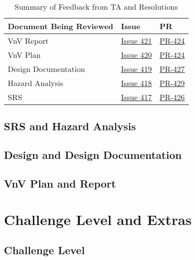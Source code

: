 \documentclass{article}
\begin{document}
\begin{table}[h!]
\centering
\begin{tabularx}{\textwidth}{lXl}
\toprule
\textbf{Document Being Reviewed} & \textbf{Issue} & \textbf{PR} \\
\midrule
VnV Report & \href{https://github.com/SyntaxSentinels/SyntaxSentinels/issues/421}{Issue 421} & \href{https://github.com/SyntaxSentinels/SyntaxSentinels/pull/424}{PR-424} \\
VnV Plan & \href{https://github.com/SyntaxSentinels/SyntaxSentinels/issues/420}{Issue 420} & \href{https://github.com/SyntaxSentinels/SyntaxSentinels/pull/424}{PR-424} \\
Design Documentation & \href{https://github.com/SyntaxSentinels/SyntaxSentinels/issues/419}{Issue 419} & \href{https://github.com/SyntaxSentinels/SyntaxSentinels/pull/427}{PR-427} \\
Hazard Analysis & \href{https://github.com/SyntaxSentinels/SyntaxSentinels/issues/418}{Issue 418} & \href{https://github.com/SyntaxSentinels/SyntaxSentinels/pull/429}{PR-429} \\
SRS & \href{https://github.com/SyntaxSentinels/SyntaxSentinels/issues/417}{Issue 417} & \href{https://github.com/SyntaxSentinels/SyntaxSentinels/pull/426}{PR-426} \\

\bottomrule
\end{tabularx}
\caption{Summary of Feedback from TA and Resolutions}
\label{tab:TA_feedback_summary}
\end{table}

\subsection{SRS and Hazard Analysis}

\subsection{Design and Design Documentation}

\subsection{VnV Plan and Report}

\section{Challenge Level and Extras}

\subsection{Challenge Level}
\end{document}

